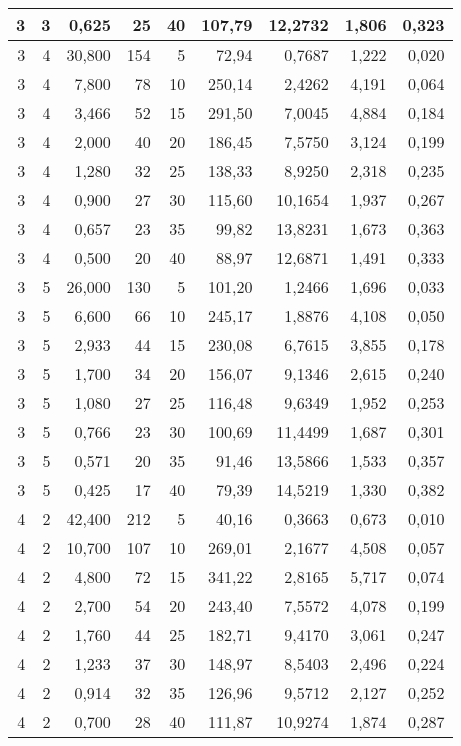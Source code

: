 \begin{tabular}{rrrrrrrrr}
3 & 3 & 0,625 & 25 & 40 & 107,79 & 12,2732 & 1,806 & 0,323 \\ \hline
3 & 4 & 30,800 & 154 & 5 & 72,94 & 0,7687 & 1,222 & 0,020 \\ \hline
3 & 4 & 7,800 & 78 & 10 & 250,14 & 2,4262 & 4,191 & 0,064 \\ \hline
3 & 4 & 3,466 & 52 & 15 & 291,50 & 7,0045 & 4,884 & 0,184 \\ \hline
3 & 4 & 2,000 & 40 & 20 & 186,45 & 7,5750 & 3,124 & 0,199 \\ \hline
3 & 4 & 1,280 & 32 & 25 & 138,33 & 8,9250 & 2,318 & 0,235 \\ \hline
3 & 4 & 0,900 & 27 & 30 & 115,60 & 10,1654 & 1,937 & 0,267 \\ \hline
3 & 4 & 0,657 & 23 & 35 & 99,82 & 13,8231 & 1,673 & 0,363 \\ \hline
3 & 4 & 0,500 & 20 & 40 & 88,97 & 12,6871 & 1,491 & 0,333 \\ \hline
3 & 5 & 26,000 & 130 & 5 & 101,20 & 1,2466 & 1,696 & 0,033 \\ \hline
3 & 5 & 6,600 & 66 & 10 & 245,17 & 1,8876 & 4,108 & 0,050 \\ \hline
3 & 5 & 2,933 & 44 & 15 & 230,08 & 6,7615 & 3,855 & 0,178 \\ \hline
3 & 5 & 1,700 & 34 & 20 & 156,07 & 9,1346 & 2,615 & 0,240 \\ \hline
3 & 5 & 1,080 & 27 & 25 & 116,48 & 9,6349 & 1,952 & 0,253 \\ \hline
3 & 5 & 0,766 & 23 & 30 & 100,69 & 11,4499 & 1,687 & 0,301 \\ \hline
3 & 5 & 0,571 & 20 & 35 & 91,46 & 13,5866 & 1,533 & 0,357 \\ \hline
3 & 5 & 0,425 & 17 & 40 & 79,39 & 14,5219 & 1,330 & 0,382 \\ \hline
4 & 2 & 42,400 & 212 & 5 & 40,16 & 0,3663 & 0,673 & 0,010 \\ \hline
4 & 2 & 10,700 & 107 & 10 & 269,01 & 2,1677 & 4,508 & 0,057 \\ \hline
4 & 2 & 4,800 & 72 & 15 & 341,22 & 2,8165 & 5,717 & 0,074 \\ \hline
4 & 2 & 2,700 & 54 & 20 & 243,40 & 7,5572 & 4,078 & 0,199 \\ \hline
4 & 2 & 1,760 & 44 & 25 & 182,71 & 9,4170 & 3,061 & 0,247 \\ \hline
4 & 2 & 1,233 & 37 & 30 & 148,97 & 8,5403 & 2,496 & 0,224 \\ \hline
4 & 2 & 0,914 & 32 & 35 & 126,96 & 9,5712 & 2,127 & 0,252 \\ \hline
4 & 2 & 0,700 & 28 & 40 & 111,87 & 10,9274 & 1,874 & 0,287 \\ \hline

\end{tabular}
